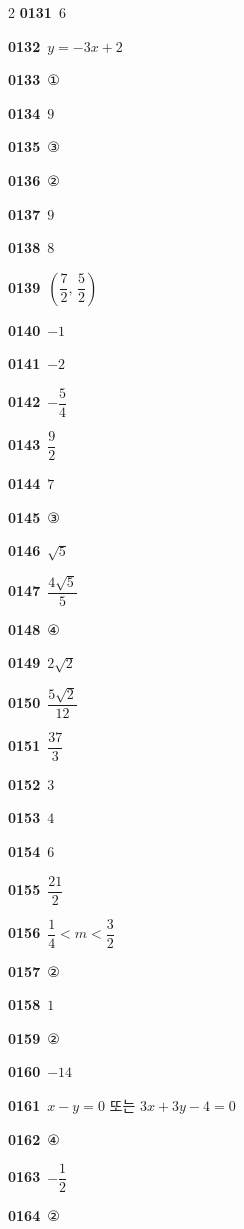 \documentclass[10pt,a4paper]{article}
\begin{document}
\begin{multicols}{2}
\noindent\textbf{0131}\ $6$\par
\noindent\textbf{0132}\ $y=-3x+2$\par
\noindent\textbf{0133}\ ①\par
\noindent\textbf{0134}\ $9$\par
\noindent\textbf{0135}\ ③\par
\noindent\textbf{0136}\ ②\par
\noindent\textbf{0137}\ $9$\par
\noindent\textbf{0138}\ $8$\par
\noindent\textbf{0139}\ $\left(\dfrac{7}{2},\,\dfrac{5}{2}\right)$\par
\noindent\textbf{0140}\ $-1$\par
\noindent\textbf{0141}\ $-2$\par
\noindent\textbf{0142}\ $-\dfrac{5}{4}$\par
\noindent\textbf{0143}\ $\dfrac{9}{2}$\par
\noindent\textbf{0144}\ $7$\par
\noindent\textbf{0145}\ ③\par
\noindent\textbf{0146}\ $\sqrt{5}$\par
\noindent\textbf{0147}\ $\dfrac{4\sqrt{5}}{5}$\par
\noindent\textbf{0148}\ ④\par
\noindent\textbf{0149}\ $2\sqrt{2}$\par
\noindent\textbf{0150}\ $\dfrac{5\sqrt{2}}{12}$\par
\noindent\textbf{0151}\ $\dfrac{37}{3}$\par
\noindent\textbf{0152}\ $3$\par
\noindent\textbf{0153}\ $4$\par
\noindent\textbf{0154}\ $6$\par
\noindent\textbf{0155}\ $\dfrac{21}{2}$\par
\noindent\textbf{0156}\ $\dfrac{1}{4}<m<\dfrac{3}{2}$\par
\noindent\textbf{0157}\ ②\par
\noindent\textbf{0158}\ $1$\par
\noindent\textbf{0159}\ ②\par
\noindent\textbf{0160}\ $-14$\par
\noindent\textbf{0161}\ $x-y=0$ 또는 $3x+3y-4=0$\par
\noindent\textbf{0162}\ ④\par
\noindent\textbf{0163}\ $-\dfrac{1}{2}$\par
\noindent\textbf{0164}\ ②\par

\end{multicols}
\end{document}
